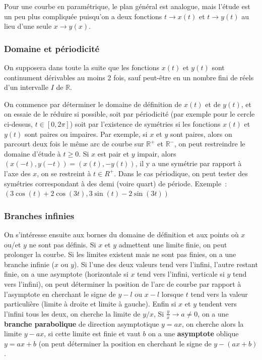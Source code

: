 \documentclass[a4paper,11pt]{article}
\begin{document}
\begin{giacjshere}
Pour une courbe en param\'etrique, le plan g\'en\'eral est analogue,
mais l'\'etude est un peu plus compliqu\'ee puisqu'on a 
deux fonctions $t \rightarrow x(t)$ et $t \rightarrow y(t)$
au lieu d'une seule $x \rightarrow y(x)$.

\subsubsection{Domaine et p\'eriodicit\'e}
On supposera dans toute la suite que les fonctions $x(t)$ et $y(t)$
sont continument d\'erivables au moins 2 fois, sauf peut-\^etre
en un nombre fini de r\'eels d'un intervalle $I$ de $\mathbb{R}$.

On commence par d\'eterminer le domaine de d\'efinition de $x(t)$
et de $y(t)$, et on essaie de le r\'eduire si possible, soit par
p\'eriodicit\'e (par exemple pour le cercle ci-dessus, $t \in [0,2 \pi]$)
soit par l'existence de sym\'etries si les fonctions
$x(t)$ et $y(t)$ sont paires ou impaires. Par exemple, si $x$ et $y$
sont paires, alors on parcourt deux fois le m\^eme arc de courbe
sur $\mathbb{R}^+$ et $\mathbb{R}^-$, on peut restreindre le domaine d'\'etude
\`a $t\geq 0$. Si $x$ est pair et $y$ impair, alors 
$(x(-t),y(-t))=(x(t),-y(t))$, il y a une sym\'etrie par rapport \`a
l'axe des $x$, on se restreint \`a $t \in R^+$.
Dans le cas p\'eriodique, on peut tester des sym\'etries correspondant
\`a des demi (voire quart) de p\'eriode.
Exemple~: $(3\cos(t)+2\cos(3t),3\sin(t)-2\sin(3t))$ 

\subsubsection{Branches infinies}
On s'int\'eresse ensuite aux bornes du domaine de d\'efinition
et aux points o\`u $x$ ou/et $y$ ne sont pas d\'efinis.
Si $x$ et $y$ admettent une limite finie, on peut prolonger la
courbe. Si les limites existent mais ne sont pas finies, 
on a une branche infinie ($x$ ou $y$). Si l'une des deux
valeurs tend vers l'infini, l'autre restant finie, on a une
asymptote (horizontale si $x$ tend vers l'infini, verticale
si $y$ tend vers l'infini), on peut d\'eterminer la position
de l'arc de courbe par rapport \`a l'asymptote en
cherchant le signe de $y-l$ ou $x-l$ lorsque $t$ tend
vers la valeur particuli\`ere (limite \`a droite et limite
\`a gauche). Enfin si $x$ et $y$ tendent vers l'infini
tous les deux, on cherche la limite de $y/x$,
Si $\frac{y}{x} \rightarrow a \neq 0$, on a une 
{\bf branche parabolique} 
de direction asymptotique $y=ax$,
on cherche alors la limite
$y-ax$, si cette limite est finie et vaut $b$ 
on a une {\bf asymptote} oblique $y=ax+b$ (on peut d\'eterminer
la position en cherchant le signe de $y-(ax+b)$.


\end{giacjshere}
\end{document}
